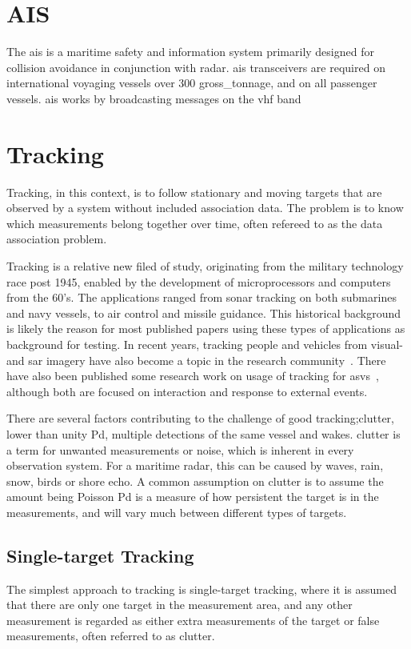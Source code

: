 \section{AIS}
The \acrfull{ais} is a maritime safety and information system primarily designed for collision avoidance in conjunction with \gls{radar}. \gls{ais} transceivers are required on international voyaging vessels over 300 \gls{gross_tonnage}, and on all passenger vessels. \gls{ais} works by broadcasting messages on the \gls{vhf} band

\section{Tracking}
Tracking, in this context, is to follow stationary and moving targets that are observed by a system without included association data. The problem is to know which measurements belong together over time, often refereed to as the data association problem. 

Tracking is a relative new filed of study, originating from the military technology race post 1945, enabled by the development of microprocessors and computers from the 60's. The applications ranged from sonar tracking on both submarines and navy vessels, to air control and missile guidance. This historical background is likely the reason for most published papers using these types of applications as background for testing. In recent years, tracking people and vehicles from visual- and \gls{sar} imagery have also become a topic in the research community~\cite{Carthel2007,Carthel2007a,Coraluppi2000}. There have also been published some research work on usage of tracking for \glspl{asv}~\cite{Wolf2010,Svec2014}, although both are focused on interaction and response to external events.

There are several factors contributing to the challenge of good tracking;\gls{clutter}, lower than unity \gls{Pd}, multiple detections of the same vessel and wakes. \Gls{clutter} is a term for unwanted measurements or noise, which is inherent in every observation system. For a maritime radar, this can be caused by waves, rain, snow, birds or shore echo. A common assumption on clutter is to assume the amount being Poisson \gls{Pd} is a measure of how persistent the target is in the measurements, and will vary much  between different types of targets. 

\subsection{Single-target Tracking}
The simplest approach to tracking is single-target tracking, where it is assumed that there are only one target in the measurement area, and any other measurement is regarded as either extra measurements of the target or false measurements, often referred to as \gls{clutter}.

